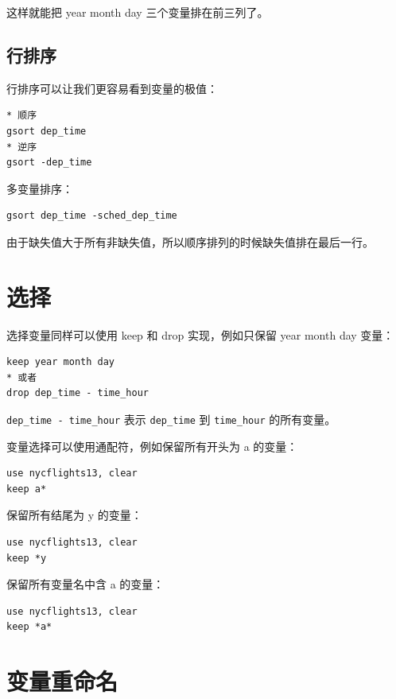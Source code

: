 \documentclass[]{ctexbook}
\begin{document}
这样就能把 year month day 三个变量排在前三列了。

\hypertarget{section-46}{%
\subsection{行排序}\label{section-46}}

行排序可以让我们更容易看到变量的极值：

\begin{lstlisting}
* 顺序
gsort dep_time
* 逆序
gsort -dep_time
\end{lstlisting}

多变量排序：

\begin{lstlisting}
gsort dep_time -sched_dep_time
\end{lstlisting}

由于缺失值大于所有非缺失值，所以顺序排列的时候缺失值排在最后一行。

\hypertarget{section-47}{%
\section{选择}\label{section-47}}

选择变量同样可以使用 keep 和 drop 实现，例如只保留 year month day 变量：

\begin{lstlisting}
keep year month day
* 或者
drop dep_time - time_hour
\end{lstlisting}

\texttt{dep\_time\ -\ time\_hour} 表示 \texttt{dep\_time} 到 \texttt{time\_hour} 的所有变量。

变量选择可以使用通配符，例如保留所有开头为 a 的变量：

\begin{lstlisting}
use nycflights13, clear
keep a*
\end{lstlisting}

保留所有结尾为 y 的变量：

\begin{lstlisting}
use nycflights13, clear
keep *y
\end{lstlisting}

保留所有变量名中含 a 的变量：

\begin{lstlisting}
use nycflights13, clear
keep *a*
\end{lstlisting}

\hypertarget{section-48}{%
\section{变量重命名}\label{section-48}}
\end{document}
